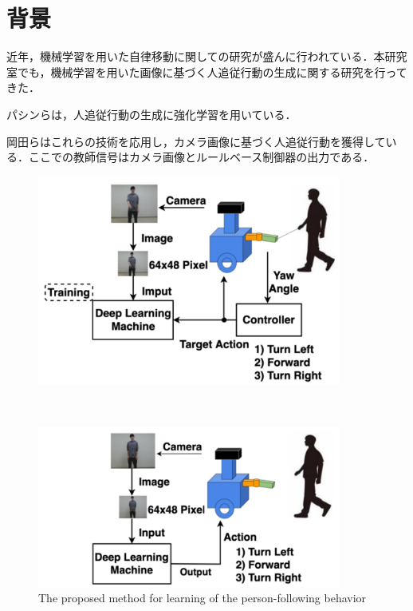 
\section{背景}
近年，機械学習を用いた自律移動に関しての研究が盛んに行われている．本研究室でも，機械学習を用いた画像に基づく人追従行動の生成に関する研究を行ってきた．

パシンら\cite{pasin1}\cite{pasin2}\cite{pasin3}は，人追従行動の生成に強化学習を用いている．

岡田ら\cite{okada}はこれらの技術を応用し，カメラ画像に基づく人追従行動を獲得している．ここでの教師信号はカメラ画像とルールベース制御器の出力である．

  \begin{figure}[h]
    \centering
    \begin{minipage}[c]{100mm} 
        \centering
        \includegraphics[width=100mm]{images/okada_learning_phase_system.png}
    \end{minipage} \\
    \vspace{1em} %
    \begin{minipage}[c]{100mm} 
        \centering
        \includegraphics[width=100mm]{images/okada_following_phase_system.png}
    \end{minipage}
    \caption{The proposed method for learning of the person-following behavior\cite{okada}}
    \label{Fig:okada_system}
  \end{figure}

\newpage
